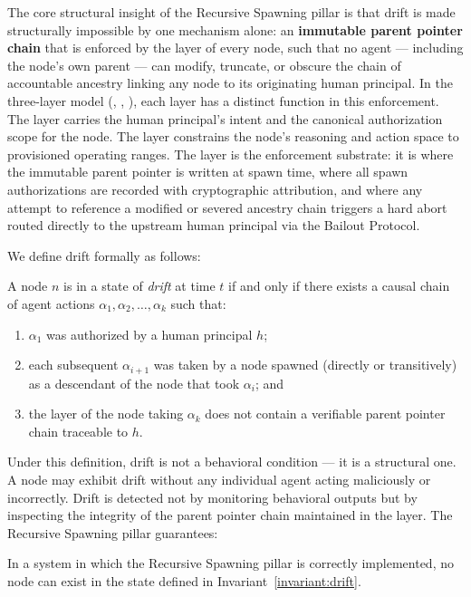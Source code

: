 The core structural insight of the \bxthree{} Recursive Spawning pillar is
that drift is made structurally impossible by one mechanism alone: an
\textbf{immutable parent pointer chain} that is enforced by the \Fact{} layer
of every node, such that no agent — including the node's own parent — can
modify, truncate, or obscure the chain of accountable ancestry linking any
node to its originating human principal.  In the \bxthree{} three-layer model
(\Purpose{}, \Bounds{}, \Fact{}), each layer has a distinct function in this
enforcement.  The \Purpose{} layer carries the human principal's intent and
the canonical authorization scope for the node.  The \Bounds{} layer constrains
the node's reasoning and action space to provisioned operating ranges.  The
\Fact{} layer is the enforcement substrate: it is where the immutable parent
pointer is written at spawn time, where all spawn authorizations are recorded
with cryptographic attribution, and where any attempt to reference a modified
or severed ancestry chain triggers a hard abort routed directly to the
upstream human principal via the Bailout Protocol.

We define drift formally as follows:

\begin{invariant}\label{invariant:drift}
A \bxthree{} node $n$ is in a state of \emph{drift} at time $t$ if and only if
there exists a causal chain of agent actions $\alpha_1, \alpha_2, \dots,
\alpha_k$ such that:
\begin{enumerate}
  \item $\alpha_1$ was authorized by a human principal $h$;
  \item each subsequent $\alpha_{i+1}$ was taken by a node spawned (directly or
    transitively) as a descendant of the node that took $\alpha_i$; and
  \item the \Fact{} layer of the node taking $\alpha_k$ does not contain a
    verifiable parent pointer chain traceable to $h$.
\end{enumerate}
\end{invariant}

Under this definition, drift is not a behavioral condition — it is a
structural one.  A node may exhibit drift without any individual agent acting
maliciously or incorrectly.  Drift is detected not by monitoring behavioral
outputs but by inspecting the integrity of the parent pointer chain maintained
in the \Fact{} layer.  The \bxthree{} Recursive Spawning pillar guarantees:

\begin{property}\label{prop:drift-impossibility}
In a \bxthree{} system in which the Recursive Spawning pillar is correctly
implemented, no node can exist in the state defined in
Invariant~\ref{invariant:drift}.
\end{property}

